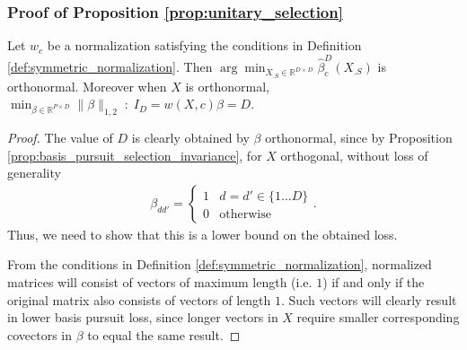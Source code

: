 \subsubsection{Proof of Proposition \ref{prop:unitary_selection}}
\label{sec:local_isometry_proof}

 \begin{proposition}
\label{prop:generalized_unitary_selection}
Let $w_c$ be a normalization satisfying the conditions in Definition \ref{def:symmetric_normalization}.  Then $\arg \min_{X_{.S} \in \mathbb R^{D \times D}} \widehat \beta^{D}_c (X_{.S}) $ is orthonormal.  Moreover when $X$ is orthonormal, $\min_{\beta \in \mathbb R^{P \times D}} \| \beta \|_{1,2} \; : \; I_D = w (  X, c) \beta = D$.
 \end{proposition}
 
 \begin{proof}

The value of $D$ is clearly obtained by $\beta$ orthonormal, since by Proposition \ref{prop:basis_pursuit_selection_invariance}, for $X$ orthogonal, without loss of generality 
\begin{align}
\beta_{dd'} = \begin{cases} 1 & d = d' \in \{ 1 \dots D\}  \\
0 & \text{otherwise}
\end{cases}.
\end{align}
Thus, we need to show that this is a lower bound on the obtained loss.

From the conditions in Definition \ref{def:symmetric_normalization}, normalized matrices will consist of vectors of maximum length (i.e. $1$) if and only if the original matrix also consists of vectors of length $1$.
Such vectors will clearly result in lower basis pursuit loss, since longer vectors in $X$ require smaller corresponding covectors in $\beta$ to equal the same result.


\end{proof}
